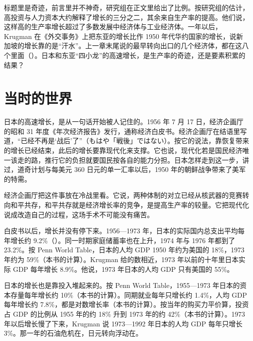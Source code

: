 标题里是奇迹，前言里并不神奇，研究组在正文里给出了比例。按研究组的估计，高投资与人力资本大约解释了增长的三分之二，其余来自生产率的提高\cite{worldbank1993}。他们说，这样高的生产率增长超过了多数发展中经济体与工业经济体\cite{worldbank1993}。一年以后，Krugman 在《外交事务》上把东亚的增长比作 1950 年代华约国家的增长，说新加坡的增长靠的是“汗水”\cite{krugman1994}。上一章末尾说的最早转向出口的几个经济体，都在这八个里面（）。日本和东亚“四小龙”的高速增长，是生产率的奇迹，还是要素积累的结果？

\section{当时的世界}\label{sec:eastasia-world}

日本的高速增长，是从一句话开始被人记住的。1956 年 7 月 17 日，经济企画厅的昭和 31 年度《年次经济报告》发行，通称经济白皮书\cite{epa1956}。经济企画厅在结语里写道，“已经不再是‘战后’了”（もはや「戦後」ではない）\cite{epa1956}。按它的说法，靠恢复带来的增长已经结束，此后的增长要靠现代化来支撑\cite{epa1956}。它也说，现代化若是国民经济唯一该走的路，推行它的负担就要国民按各自的能力分担\cite{epa1956}。日本怎样走到这一步，讲过，道奇计划与每美元 360 日元的单一汇率以后，1950 年的朝鲜战争带来了美军的特需。

经济企画厅把这件事放在冷战里看。它说，两种体制的对立已经从核武器的竞赛转向和平共存，和平共存就是经济增长率的竞争，是提高生产率的较量\cite{epa1956}。它把现代化说成改造自己的过程，这场手术不可能没有痛苦\cite{epa1956}。

白皮书以后，增长并没有停下来。1956—1973 年，日本的实际国内总支出平均每年增长约 9.2\%（）。同一时期家庭储蓄率也在上升，1974 年与 1976 年都到了 23.2\%。按 Penn World Table，日本的人均 GDP 1950 年约为美国的 18\%，1973 年约为 59\%（本书的计算）\cite{pwt1001}。Krugman 给的数相近，1973 年以前的十年里日本实际 GDP 每年增长 8.9\%\cite{krugman1994}。他说，1973 年日本的人均 GDP 只有美国的 55\%\cite{krugman1994}。

日本的增长也是靠投入堆起来的。按 Penn World Table，1955—1973 年日本的资本存量每年增长约 10\%（本书的计算）\cite{pwt1001}。同期就业每年只增长约 1.4\%，人均 GDP 每年增长约 7.8\%，都是对数增长率（本书的计算）。按当年的购买力平价算，投资占 GDP 的比例从 1955 年的约 18\% 升到 1973 年的约 42\%（本书的计算）。1973 年以后增长慢了下来，Krugman 说 1973—1992 年日本的人均 GDP 每年只增长 3\%\cite{krugman1994}。那一年的石油危机在，日元转向浮动在。

